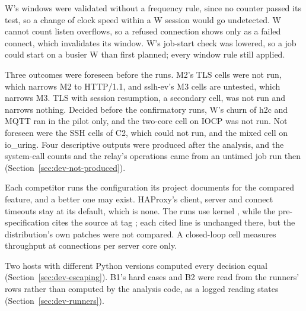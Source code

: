  W's windows were validated without a frequency rule, since no counter passed its
test, so a change of clock speed within a W session would go undetected. W cannot count listen
overflows, so a refused connection shows only as a failed connect, which invalidates its window.
W's job-start check was lowered, so a job could start on a busier W than first planned; every
window rule still applied.

 Three outcomes were foreseen before the runs. M2's TLS cells were not
run, which narrows M2 to HTTP/1.1, and sslh-ev's M3 cells are untested, which narrows M3. TLS with
session resumption, a secondary cell, was not run and narrows nothing. Decided before the
confirmatory runs, W's churn of h2c and MQTT ran in the pilot only, and the two-core cell on IOCP
was not run. Not foreseen were the SSH cells of C2, which could not run, and the mixed cell on
io\_uring. Four descriptive outputs were produced after the analysis, and the system-call counts
and the relay's operations came from an untimed job run then (Section~\ref{sec:dev-not-produced}).

 Each competitor runs the configuration its project documents
for the compared feature, and a better one may exist. HAProxy's client, server and connect timeouts
stay at its default, which is none. The runs use kernel \KernelL, while the pre-specification cites
the source at tag \KernelTag; each cited line is unchanged there, but the distribution's own patches
were not compared. A closed-loop cell measures throughput at \ConnSlots{} connections per server
core only.

 Two hosts with different Python versions computed every decision equal
(Section~\ref{sec:dev-escaping}). B1's hard cases and B2 were read from the runners' rows rather than
computed by the analysis code, as a logged reading states (Section~\ref{sec:dev-runners}).
